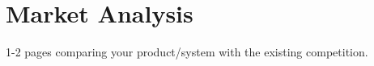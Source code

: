 \documentclass[requirements.tex]{subfiles}
\begin{document}
\section{Market Analysis} %
\label{sec:market_analysis}

1-2 pages comparing your product/system with the existing competition.

\newpage
\end{document}

